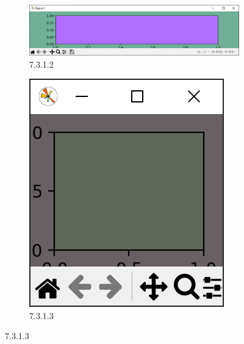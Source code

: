 \documentclass[12pt]{article}
\begin{document}
\begin{figure}[H]
    \centering
    \begin{subfigure}[b]{0.6\textwidth}
        \includegraphics[width=\textwidth]{React resize Pic3.png} %
        \caption{7.3.1.2}
        \label{fig:line-graph2}
    \end{subfigure}
    \hfill
    \begin{subfigure}[b]{0.35\textwidth}
        \includegraphics[width=\textwidth]{React resize Pic4.png} %
        \caption{7.3.1.3}
        \label{fig:line-graph2-pic2}
    \end{subfigure}
\end{figure}
\end{document}
